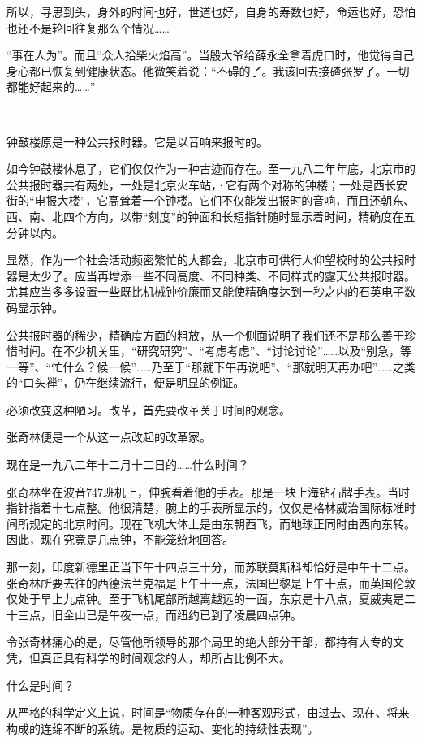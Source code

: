 \par 所以，寻思到头，身外的时间也好，世道也好，自身的寿数也好，命运也好，恐怕也还不是轮回往复那么个情况……
\par “事在人为”。而且“众人拾柴火焰高”。当殷大爷给薛永全拿着虎口时，他觉得自己身心都已恢复到健康状态。他微笑着说：“不碍的了。我该回去接碴张罗了。一切都能好起来的……”
\par  
\par 钟鼓楼原是一种公共报时器。它是以音响来报时的。
\par 如今钟鼓楼休息了，它们仅仅作为一种古迹而存在。至一九八二年年底，北京市的公共报时器共有两处，一处是北京火车站，·它有两个对称的钟楼；一处是西长安街的“电报大楼”，它高耸着一个钟楼。它们不仅能发出报时的音响，而且还朝东、西、南、北四个方向，以带“刻度”的钟面和长短指针随时显示着时间，精确度在五分钟以内。
\par 显然，作为一个社会活动频密繁忙的大都会，北京市可供行人仰望校时的公共报时器是太少了。应当再增添一些不同高度、不同种类、不同样式的露天公共报时器。尤其应当多多设置一些既比机械钟价廉而又能使精确度达到一秒之内的石英电子数码显示钟。
\par 公共报时器的稀少，精确度方面的粗放，从一个侧面说明了我们还不是那么善于珍惜时间。在不少机关里，“研究研究”、“考虑考虑”、“讨论讨论”……以及“别急，等一等”、“忙什么？候一候”……乃至于“那就下午再说吧”、“那就明天再办吧”……之类的“口头禅”，仍在继续流行，便是明显的例证。
\par 必须改变这种陋习。改革，首先要改革关于时间的观念。
\par 张奇林便是一个从这一点改起的改革家。
\par 现在是一九八二年十二月十二日的……什么时间？
\par 张奇林坐在波音747班机上，伸腕看着他的手表。那是一块上海钻石牌手表。当时指针指着十七点整。他很清楚，腕上的手表所显示的，仅仅是格林威治国际标准时间所规定的北京时间。现在飞机大体上是由东朝西飞，而地球正同时由西向东转。因此，现在究竟是几点钟，不能笼统地回答。
\par 那一刻，印度新德里正当下午十四点三十分，而苏联莫斯科却恰好是中午十二点。张奇林所要去往的西德法兰克福是上午十一点，法国巴黎是上午十点，而英国伦敦仅处于早上九点钟。至于飞机尾部所越离越远的一面，东京是十八点，夏威夷是二十三点，旧金山已是午夜一点，而纽约已到了凌晨四点钟。
\par 令张奇林痛心的是，尽管他所领导的那个局里的绝大部分干部，都持有大专的文凭，但真正具有科学的时间观念的人，却所占比例不大。
\par 什么是时间？
\par 从严格的科学定义上说，时间是“物质存在的一种客观形式，由过去、现在、将来构成的连绵不断的系统。是物质的运动、变化的持续性表现”。

